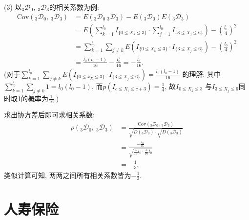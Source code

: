 \documentclass[lang=cn,10pt]{elegantbook}
\begin{document}
\begin{solution}
(3) 以$_{3}\mathscr D _{0},\ _{3}\mathscr D _{3}$的相关系数为例:
\begin{equation*}
\begin{aligned}
    \text{Cov}(_{3}\mathscr D _{0},\ _{3}\mathscr D _{3}) & =E({}_{3}\mathscr D _{0}\ _{3}\mathscr D _{3})-E(_{3}\mathscr D _{0})E(_{3}\mathscr D _{3})                                \\
                                                          & =E(\sum ^{l_{0}}_{k=1}I_{\{0\leq X_{k}\leq 3\}}\cdot \sum ^{l_{0}}_{j=1}I_{\{3\leq X_{j}\leq 6\}})-(\frac{l_{0}}{4})^{2} \\
                                                          & =\sum^{l_{0}}_{k=1}\sum_{j\neq k}E(I_{\{0\leq X_{k}\leq 3\}}\cdot I_{\{3\leq X_{j}\leq 6\}})-(\frac{ l_{0}}{4})^{2}      \\
                                                          & =\frac{l_{0}(l_{0}-1)}{16}-\frac{l_{0}^{2}}{16}  =-\frac{l_{0}}{16}.
\end{aligned}
\end{equation*}
(对于$\sum^{l_{0}}_{k=1}\sum_{j\neq k}E(I_{\{0\leq x_{X}\leq 3\}}\cdot I_{\{3\leq X_{j}\leq 6\}}) = \frac{l_{0}(l_{0}-1)}{16}$ 的理解: 其中$\sum^{l_{0}}_{k=1}\sum_{j\neq k}1 = l_0(l_0-1)$, 而$p(I_{c\leq X_{i}\leq c+3}) = \frac14$, 故$I_{0\leq X_{k}\leq 3}$ 与$I_{3\leq X_{j}\leq 6}$同时取1的概率为$\frac{1}{16}$.)

求出协方差后即可求相关系数:
\begin{align*}
    \rho(_{3}\mathscr D _{0},\ _{3}\mathscr D _{3}) & =\frac{\text{Cov}(_{3}\mathscr D_{0},\ _{3}\mathscr D _{3})}{\sqrt{D(_{3}\mathscr D _{0})}\cdot \sqrt{D(_{3}\mathscr D _{3})}} \\
                                                    & =\frac{-\frac{l_{0}}{16}}{\sqrt{\frac{3}{16}l_{0}\cdot \frac{3}{16}l_{0}}}                                                     \\
                                                    & =-\frac{1}{3}.
\end{align*}
类似计算可知, 两两之间所有相关系数皆为$-\frac{1}{3}$.
\end{solution}

\chapter{人寿保险}
\end{document}
